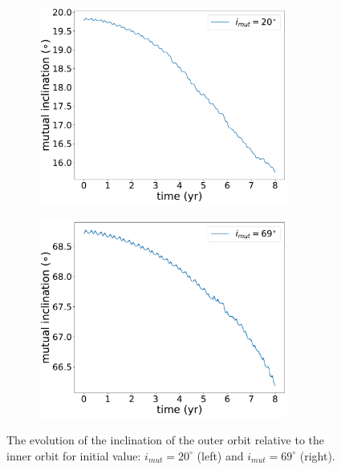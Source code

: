 \begin{figure}[!htb]
    \centering
    \begin{subfigure}{.5\textwidth}
    \centering
    \includegraphics[width=0.9\textwidth]{Thesis/graphs/inclination_case/inc_20.pdf}
    \end{subfigure}%
    \begin{subfigure}{.5\textwidth}
    \centering
    \includegraphics[width=0.9\textwidth]{Thesis/graphs/inclination_case/inc_69.pdf}
    \end{subfigure}
    \caption{ The evolution of the inclination of the outer orbit relative to the inner orbit for initial value: $i_{mut}=20^{\circ}$ (left) and $i_{mut}=69^{\circ}$ (right).}
    \label{fig:mutual_inclination}
\end{figure}


